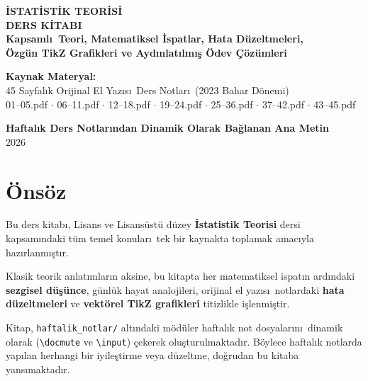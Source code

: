 \documentclass[11pt,a4paper,oneside]{book}
\begin{document}
\shorthandoff{=}

\begin{titlepage}
\centering
\vspace*{1.5cm}
{\Huge\bfseries\color{primaryblue} \.{I}STAT\.{I}ST\.{I}K TEOR\.{I}S\.{I} \\[0.4em] \LARGE DERS K\.{I}TABI}\\[1.5cm]
{\Large\bfseries Kapsaml\i\ Teori, Matematiksel \.{I}spatlar, Hata D\"{u}zeltmeleri,\\[0.3em]
\"{O}zg\"{u}n TikZ Grafikleri ve Ayd\i nlat\i lm\i \c{s} \"{O}dev \c{C}\"{o}z\"{u}mleri}\\[2cm]

\begin{tcolorbox}[enhanced, colback=secondaryblue, colframe=primaryblue, width=0.88\textwidth, arc=2mm, boxrule=1pt]
\centering\large
\textbf{Kaynak Materyal:}\\
45 Sayfal\i k Orijinal El Yaz\i s\i\ Ders Notlar\i\ (2023 Bahar D\"{o}nemi)\\
\vspace{0.4em}
\normalsize
01--05.pdf $\cdot$ 06--11.pdf $\cdot$ 12--18.pdf $\cdot$ 19--24.pdf $\cdot$ 25--36.pdf $\cdot$ 37--42.pdf $\cdot$ 43--45.pdf
\end{tcolorbox}

\vfill
{\large \textbf{Haftal\i k Ders Notlar\i ndan Dinamik Olarak Ba\u{g}lanan Ana Metin}}\\[0.5em]
{\large 2026}
\vspace*{1cm}
\end{titlepage}

\frontmatter

\chapter*{\"{O}ns\"{o}z}
Bu ders kitab\i, Lisans ve Lisans\"{u}st\"{u} d\"{u}zey \textbf{\.{I}statistik Teorisi} dersi kapsam\i ndaki t\"{u}m temel konular\i\ tek bir kaynakta toplamak amac\i yla haz\i rlanm\i\c{s}t\i r. 

Klasik teorik anlat\i mlar\i n aksine, bu kitapta her matematiksel ispat\i n ard\i ndaki \textbf{sezgisel d\"{u}\c{s}\"{u}nce}, g\"{u}nl\"{u}k hayat analojileri, orijinal el yaz\i s\i\ notlardaki \textbf{hata d\"{u}zeltmeleri} ve \textbf{vekt\"{o}rel TikZ grafikleri} titizlikle i\c{s}lenmi\c{s}tir.

Kitap, \texttt{haftalik\_notlar/} alt\i ndaki m\"{o}d\"{u}ler haftal\i k not dosyalar\i n\i\ dinamik olarak (\texttt{\textbackslash docmute} ve \texttt{\textbackslash input}) \c{c}ekerek olu\c{s}turulmaktad\i r. B\"{o}ylece haftal\i k notlarda yap\i lan herhangi bir iyile\c{s}tirme veya d\"{u}zeltme, do\u{g}rudan bu kitaba yans\i maktad\i r.
\end{document}
